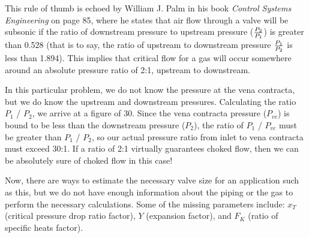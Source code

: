 This rule of thumb is echoed by William J. Palm in his book {\it Control Systems Engineering} on page 85, where he states that air flow through a valve will be subsonic if the ratio of downstream pressure to upstream pressure ($P_2 \over P_1$) is greater than 0.528 (that is to say, the ratio of upstream to downstream pressure $P_1 \over P_2$ is less than 1.894).  This implies that critical flow for a gas will occur somewhere around an absolute pressure ratio of 2:1, upstream to downstream.

\vskip 10pt

In this particular problem, we do not know the pressure at the vena contracta, but we do know the upstream and downstream pressures.  Calculating the ratio $P_1$ / $P_2$, we arrive at a figure of 30.  Since the vena contracta pressure ($P_{vc}$) is bound to be less than the downstream pressure ($P_{2}$), the ratio of $P_1$ / $P_{vc}$ must be greater than $P_1$ / $P_2$, so our actual pressure ratio from inlet to vena contracta must exceed 30:1.  If a ratio of 2:1 virtually guarantees choked flow, then we can be absolutely sure of choked flow in this case!

\vskip 10pt

Now, there are ways to estimate the necessary valve size for an application such as this, but we do not have enough information about the piping or the gas to perform the necessary calculations.  Some of the missing parameters include: $x_T$ (critical pressure drop ratio factor), $Y$ (expansion factor), and $F_K$ (ratio of specific heats factor).




